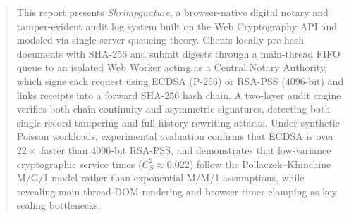 \documentclass[11pt,a4paper]{article}
\begin{document}
\begin{abstract}
\noindent
This report presents \emph{Shrimpgnature}, a browser-native digital notary and tamper-evident audit log system built on the Web Cryptography API and modeled via single-server queueing theory. Clients locally pre-hash documents with SHA-256 and submit digests through a main-thread FIFO queue to an isolated Web Worker acting as a Central Notary Authority, which signs each request using ECDSA (P-256) or RSA-PSS (4096-bit) and links receipts into a forward SHA-256 hash chain. A two-layer audit engine verifies both chain continuity and asymmetric signatures, detecting both single-record tampering and full history-rewriting attacks. Under synthetic Poisson workloads, experimental evaluation confirms that ECDSA is over $22\times$ faster than 4096-bit RSA-PSS, and demonstrates that low-variance cryptographic service times ($C_S^2 \approx 0.022$) follow the Pollaczek--Khinchine M/G/1 model rather than exponential M/M/1 assumptions, while revealing main-thread DOM rendering and browser timer clamping as key scaling bottlenecks.
\end{abstract}
\pagebreak
\tableofcontents
\clearpage
{}
\end{document}
